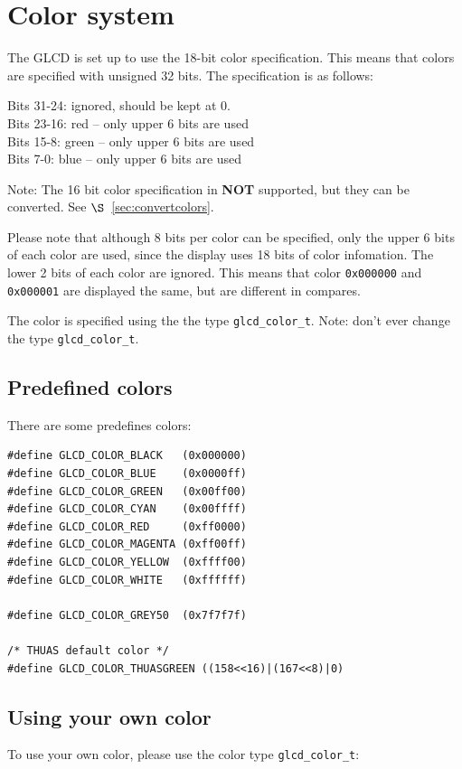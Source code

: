 \documentclass[12pt]{article}
\begin{document}
\section{Color system}
The GLCD is set up to use the 18-bit color specification. This means that colors are specified with unsigned 32 bits. The specification is as follows:

Bits 31-24: ignored, should be kept at 0.\\
Bits 23-16: red -- only upper 6 bits are used\\
Bits 15-8: green -- only upper 6 bits are used\\
Bits 7-0: blue -- only upper 6 bits are used

Note: The 16 bit color specification in \textbf{NOT} supported, but they can be converted. See $\S$~\ref{sec:convertcolors}.

Please note that although 8 bits per color can be specified, only the upper 6 bits of each color are used, since the display uses 18 bits of color infomation. The lower 2 bits of each color are ignored. This means that color \lstinline|0x000000| and \lstinline|0x000001| are displayed the same, but are different in compares.

The color is specified using the the type \lstinline|glcd_color_t|. Note: don't ever change the type \lstinline|glcd_color_t|.

\subsection{Predefined colors}
There are some predefines colors:

\begin{lstlisting}
#define GLCD_COLOR_BLACK   (0x000000)
#define GLCD_COLOR_BLUE    (0x0000ff)
#define GLCD_COLOR_GREEN   (0x00ff00)
#define GLCD_COLOR_CYAN    (0x00ffff)
#define GLCD_COLOR_RED     (0xff0000)
#define GLCD_COLOR_MAGENTA (0xff00ff)
#define GLCD_COLOR_YELLOW  (0xffff00)
#define GLCD_COLOR_WHITE   (0xffffff)

#define GLCD_COLOR_GREY50  (0x7f7f7f)

/* THUAS default color */
#define GLCD_COLOR_THUASGREEN ((158<<16)|(167<<8)|0)
\end{lstlisting}

\subsection{Using your own color}
To use your own color, please use the color type \lstinline|glcd_color_t|:
\end{document}
